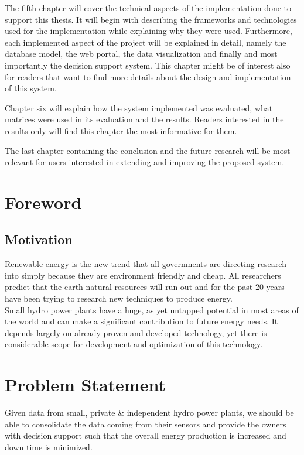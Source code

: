 \indent The fifth chapter will cover the technical aspects of the implementation done to support this thesis. It will begin with describing the frameworks and technologies used for the implementation while explaining why they were used. Furthermore, each implemented aspect of the project will be explained in detail, namely the database model, the web portal, the data visualization and finally and most importantly the decision support system. This chapter might be of interest also for readers that want to find more details about the design and implementation of this system.

\indent Chapter six will explain how the system implemented was evaluated, what matrices were used in its evaluation and the results. Readers interested in the results only will find this chapter the most informative for them.

\indent The last chapter containing the conclusion and the future research will be most relevant for users interested in extending and improving the proposed system.
\section{Foreword}
\label{sec:Foreword}
\subsection{Motivation}          
\label{subsec:Motivation}
\indent Renewable energy is the new trend that all governments are directing research into simply because they are environment friendly and cheap. All researchers predict that the earth natural resources will run out and for the past 20 years have been trying to research new techniques to produce energy.\cite{SEIT2017} \\

Small hydro power plants have a huge, as yet untapped potential in most areas of the world and can make a significant contribution to future energy needs. It depends largely on already proven and developed technology, yet there is considerable scope for development and optimization of this technology.


\section{Problem Statement}
\label{sec:Problem Statement}
\indent Given data from small, private \& independent hydro power plants, we should be able to consolidate the data coming from their sensors and provide the owners with decision support such that the overall energy production is increased and down time is minimized. \\
